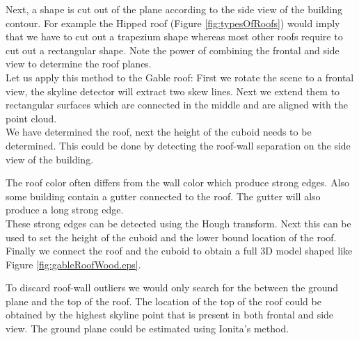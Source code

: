 Next, a shape is cut out of the plane according to the side view of the building contour.
For example the Hipped roof (Figure \ref{fig:typesOfRoofs}) would imply that we have to cut
out a trapezium shape whereas most other roofs require to cut out a rectangular shape.
Note the power of combining the frontal and side view to determine the roof
planes.\\

Let us apply this method to the Gable roof: First we rotate the scene to a
frontal view, the skyline detector will extract two skew lines. Next we extend them to 
rectangular surfaces which are connected in the middle and are aligned with the
point cloud.\\

\newpage
We have determined the roof, next the height of the cuboid needs to be determined.
This could be done by detecting the roof-wall separation on the side view of the
building.  

The roof color often differs from the wall color which produce strong edges. 
Also some building contain a gutter connected to the roof. The gutter will also
produce a long strong edge.  \\

These strong edges can be detected using the Hough transform. Next this can be
used to set the height of the cuboid and the lower bound location of the roof.
Finally we connect the roof and the cuboid to obtain a full 3D model shaped like
Figure \ref{fig:gableRoofWood.eps}.\\


To discard roof-wall outliers we would only search for the between the ground plane and the top of
the roof.  The location of the top of the roof could be obtained by the highest skyline point that
is present in both frontal and side view. The ground plane could be estimated
using Ionita's \cite{costin} method.
\clearpage


